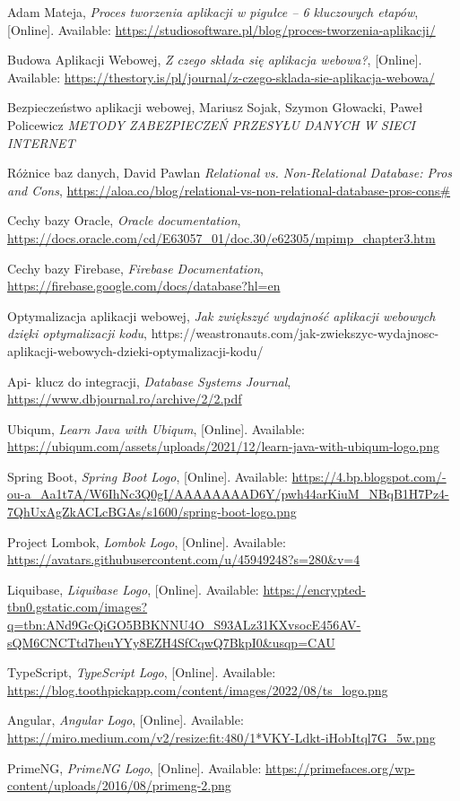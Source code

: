 \begin{thebibliography}{99}
\small

Adam Mateja, \emph{Proces tworzenia aplikacji w pigułce – 6 kluczowych etapów}, [Online]. Available: \url{https://studiosoftware.pl/blog/proces-tworzenia-aplikacji/}

Budowa Aplikacji Webowej, \emph{Z czego składa się aplikacja webowa?}, [Online]. Available: \url{https://thestory.is/pl/journal/z-czego-sklada-sie-aplikacja-webowa/}

Bezpieczeństwo aplikacji webowej,  Mariusz Sojak, Szymon Głowacki, Paweł Policewicz \emph{METODY ZABEZPIECZEŃ PRZESYŁU DANYCH
W SIECI INTERNET}

Różnice baz danych, David Pawlan \emph{Relational vs. Non-Relational Database: Pros and Cons}, \url{https://aloa.co/blog/relational-vs-non-relational-database-pros-cons#}

Cechy bazy Oracle, \emph{Oracle documentation}, \url{https://docs.oracle.com/cd/E63057_01/doc.30/e62305/mpimp_chapter3.htm}

Cechy bazy Firebase, \emph{Firebase Documentation}, \url{https://firebase.google.com/docs/database?hl=en}

Optymalizacja aplikacji webowej, \emph{Jak zwiększyć wydajność aplikacji webowych dzięki optymalizacji kodu}, https://weastronauts.com/jak-zwiekszyc-wydajnosc-aplikacji-webowych-dzieki-optymalizacji-kodu/

Api- klucz do integracji, \emph{Database Systems Journal}, \url{https://www.dbjournal.ro/archive/2/2.pdf}

Ubiqum, \emph{Learn Java with Ubiqum}, [Online]. Available: \url{https://ubiqum.com/assets/uploads/2021/12/learn-java-with-ubiqum-logo.png}

Spring Boot, \emph{Spring Boot Logo}, [Online]. Available: \url{https://4.bp.blogspot.com/-ou-a_Aa1t7A/W6IhNc3Q0gI/AAAAAAAAD6Y/pwh44arKiuM_NBqB1H7Pz4-7QhUxAgZkACLcBGAs/s1600/spring-boot-logo.png}

Project Lombok, \emph{Lombok Logo}, [Online]. Available: \url{https://avatars.githubusercontent.com/u/45949248?s=280&v=4}

Liquibase, \emph{Liquibase Logo}, [Online]. Available: \url{https://encrypted-tbn0.gstatic.com/images?q=tbn:ANd9GcQiGO5BBKNNU4O_S93ALz31KXvsocE456AV-sQM6CNCTtd7heuYYy8EZH4SfCqwQ7BkpI0&usqp=CAU}

TypeScript, \emph{TypeScript Logo}, [Online]. Available: \url{https://blog.toothpickapp.com/content/images/2022/08/ts_logo.png}

Angular, \emph{Angular Logo}, [Online]. Available: \url{https://miro.medium.com/v2/resize:fit:480/1*VKY-Ldkt-iHobItql7G_5w.png}

PrimeNG, \emph{PrimeNG Logo}, [Online]. Available: \url{https://primefaces.org/wp-content/uploads/2016/08/primeng-2.png}

\end{thebibliography}
